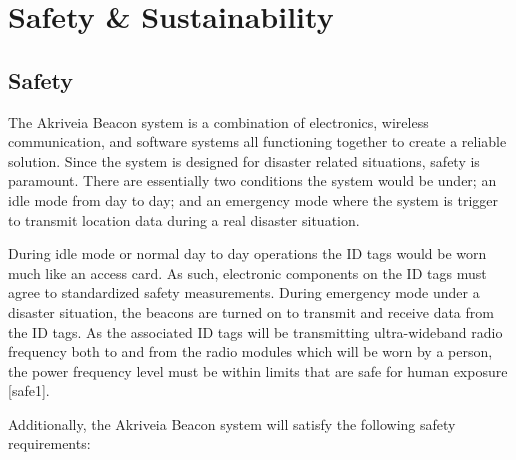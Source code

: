%

\setcounter{section}{4}
\section{Safety \& Sustainability}
\bigskip
\subsection{Safety}
\medskip
The Akriveia Beacon system is a combination of electronics, wireless communication, and software systems all functioning together to create a reliable solution. Since the system is designed for disaster related situations, safety is paramount. There are essentially two conditions the system would be under; an idle mode from day to day; and an emergency mode where the system is trigger to transmit location data during a real disaster situation.

\bigskip
During idle mode or normal day to day operations the ID tags would be worn much like an access card. As such, electronic components on the ID tags must agree to standardized safety measurements. During emergency mode under a disaster situation, the beacons are turned on to transmit and receive data from the ID tags. As the associated ID tags will be transmitting ultra-wideband radio frequency both to and from the radio modules which will be worn by a person, the power frequency level must be within limits that are safe for human exposure [safe1].
 
\bigskip
Additionally, the Akriveia Beacon system will satisfy the following safety requirements:

